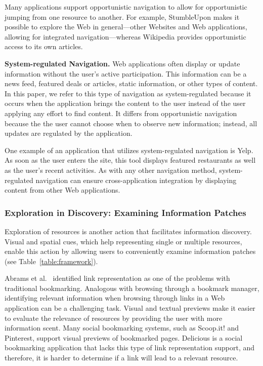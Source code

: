 \documentclass{sigchi}
\newcommand{\feature}[1]{{\ttfamily#1}}
\begin{document}
{Many applications support \feature{opportunistic navigation} to allow for opportunistic jumping from one resource to another. For example, StumbleUpon makes it possible to explore the Web in general---other Websites and Web applications, allowing for \feature{integrated} navigation---whereas Wikipedia provides opportunistic access to its own articles. 


\textbf{System-regulated Navigation.}
Web applications often display or update information without the user's active participation. This information can be a \feature{news feed}, \feature{featured} deals or articles, \feature{static information}, or other types of content. In this paper, we refer to this type of navigation as system-regulated because it occurs when the application brings the content to the user instead of the user applying any effort to find content. It differs from opportunistic navigation because the the user cannot choose when to observe new information; instead, all updates are regulated by the application. 

One example of an application that utilizes system-regulated navigation is Yelp. As soon as the user enters the site, this tool displays featured restaurants as well as the user's recent activities. As with any other navigation method, system-regulated navigation can ensure cross-application \feature{integration} by displaying content from other Web applications. 


{\subsubsection{Exploration in Discovery: Examining Information Patches}
Exploration of resources is another action that facilitates information discovery. Visual and spatial cues, which help representing single or multiple resources, enable this action by allowing users to conveniently examine information patches (see Table~\ref{table:framework}). 


Abrams et al.~\cite{abrams1998information} identified link representation as one of the problems with traditional bookmarking. Analogous with browsing through a bookmark manager, identifying relevant information when browsing through links in a Web application can be a challenging task. \feature{Visual} and \feature{textual previews} make it easier to evaluate the relevance of resources by providing the user with more information scent. Many social bookmarking systems, such as Scoop.it! and Pinterest, support visual previews of bookmarked pages. Delicious is a social bookmarking application that lacks this type of link representation support, and therefore, it is harder to determine if a link will lead to a relevant resource.

}}
\end{document}
